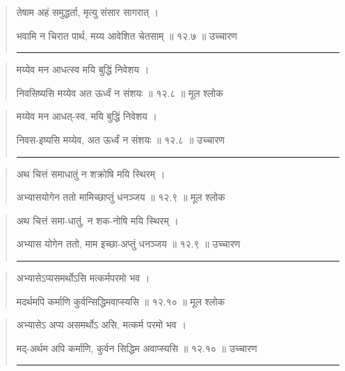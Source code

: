 \begin{quotation}

तेषाम अहं समुद्धर्ता, मृत्यु संसार सागरात्‌  ।  

भवामि न चिरात पार्थ, मय्य आवेशित चेतसाम्‌  ॥ १२.७ ॥  उच्चारण

\noindent\rule{16cm}{0.4pt} 
\end{quotation}


\begin{quotation} 

मय्येव मन आधत्स्व मयि बुद्धिं निवेशय  ।  

निवसिष्यसि मय्येव अत ऊर्ध्वं न संशयः  ॥ १२.८ ॥  मूल श्लोक
\end{quotation}

\begin{quotation}

मय्येव मन आधत्-स्व, मयि बुद्धिं निवेशय  ।  

निवस-इष्यसि मय्येव, अत ऊर्ध्वं न संशयः  ॥ १२.८ ॥  उच्चारण

\noindent\rule{16cm}{0.4pt} 
\end{quotation}


\begin{quotation} 

अथ चित्तं समाधातुं न शक्रोषि मयि स्थिरम्‌  ।  

अभ्यासयोगेन ततो मामिच्छाप्तुं धनञ्जय  ॥ १२.९ ॥  मूल श्लोक
\end{quotation}

\begin{quotation}

अथ चित्तं समा-धातुं, न शक-नोषि मयि स्थिरम्‌  ।  

अभ्यास योगेन ततो, माम इच्छा-अप्तुं धनञ्जय  ॥ १२.९ ॥  उच्चारण

\noindent\rule{16cm}{0.4pt} 
\end{quotation}


\begin{quotation} 

अभ्यासेऽप्यसमर्थोऽसि मत्कर्मपरमो भव  ।  

मदर्थमपि कर्माणि कुर्वन्सिद्धिमवाप्स्यसि  ॥ १२.१० ॥  मूल श्लोक
\end{quotation}

\begin{quotation}

अभ्यासेऽ अप्य असमर्थोऽ असि, मत्कर्म परमो भव  ।  

मद्-अर्थम अपि कर्माणि, कुर्वन सिद्धिम अवाप्स्यसि  ॥ १२.१० ॥  उच्चारण

\noindent\rule{16cm}{0.4pt} 
\end{quotation}


